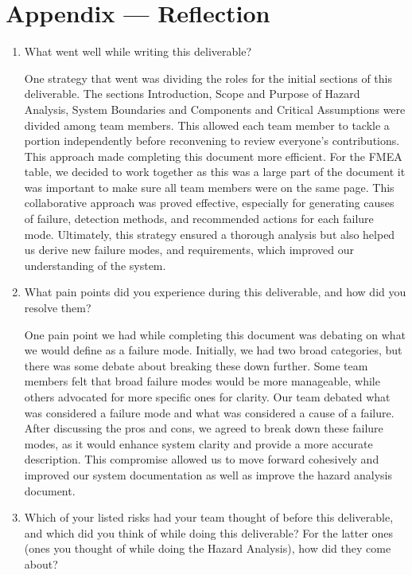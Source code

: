 \documentclass{article}
\begin{document}
\newpage{}

\section*{Appendix --- Reflection}



\begin{enumerate}
    \item What went well while writing this deliverable?
    
    One strategy that went was dividing the roles for the initial sections of this deliverable. 
    The sections Introduction, Scope and Purpose of Hazard Analysis, System Boundaries and Components and Critical Assumptions were divided among team members.
    This allowed each team member to tackle a portion independently before reconvening to review everyone’s contributions.  
    This approach made completing this document more efficient. 
    For the FMEA table, we decided to work together as this was a large part of the document it was important to make sure all team members were on the same page. 
    This collaborative approach was proved effective, especially for generating causes of failure, detection methods, and recommended actions for each failure mode.
    Ultimately, this strategy ensured a thorough analysis but also helped us derive new failure modes, and requirements, which improved our understanding of the system.
    
    \item What pain points did you experience during this deliverable, and how
    did you resolve them?
    
    One pain point we had while completing this document was debating on what we would define as a failure mode. 
    Initially, we had two broad categories, but there was some debate about breaking these down further. 
    Some team members felt that broad failure modes would be more manageable, while others advocated for more specific ones for clarity. 
    Our team debated what was considered a failure mode and what was considered a cause of a failure. 
    After discussing the pros and cons, we agreed to break down these failure modes, as it would enhance system clarity and provide a more accurate description. 
    This compromise allowed us to move forward cohesively and improved our system documentation as well as improve the hazard analysis document.
    
    \item Which of your listed risks had your team thought of before this
    deliverable, and which did you think of while doing this deliverable? For
    the latter ones (ones you thought of while doing the Hazard Analysis), how
    did they come about?


\end{enumerate}
\end{document}
